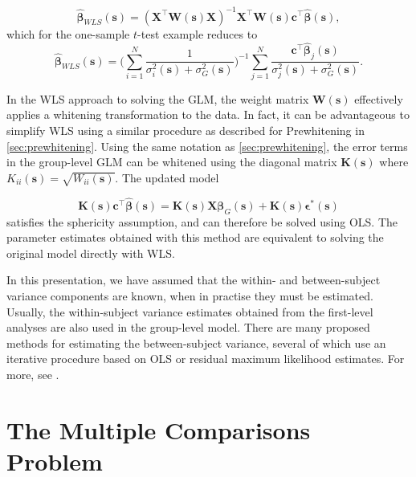 \begin{equation}
\label{eq:WLS_estimates}
\hat{\bm{\beta}}_{WLS}(\bm{s}) = (\bm{X}^{\intercal}\bm{W}(\bm{s})\bm{X})^{-1}\bm{X}^{\intercal}\bm{W}(\bm{s})\bm{c}^{\intercal}\hat{\bm{\beta}}(\bm{s}),
\end{equation}
which for the one-sample $t$-test example reduces to
\begin{equation}
\label{eq:WLS_t_test}
\hat{\bm{\beta}}_{WLS}(\bm{s}) = \Bigg(\sum_{i=1}^{N} \frac{1}{\sigma^{2}_{i}(\bm{s}) + \sigma^{2}_{G}(\bm{s})}\Bigg)^{-1}\sum_{j=1}^{N} \frac{\bm{c}^{\intercal}\hat{\bm{\beta}}_{j}(\bm{s})}{\sigma^{2}_{j}(\bm{s}) + \sigma^{2}_{G}(\bm{s})}.
\end{equation}

In the WLS approach to solving the GLM, the weight matrix $\bm{W}(\bm{s})$ effectively applies a whitening transformation to the data. In fact, it can be advantageous to simplify WLS using a similar procedure as described for Prewhitening in \ref{sec:prewhitening}. Using the same notation as \ref{sec:prewhitening}, the error terms in the group-level GLM can be whitened using the diagonal matrix $\bm{K}(\bm{s})$ where $K_{ii}(\bm{s}) = \sqrt{W_{ii}(\bm{s})}$.  The updated model

\begin{equation} 
\label{eq:whitened_group_model}
\bm{K}(\bm{s})\bm{c}^{\intercal}\hat{\bm{\beta}}(\bm{s}) = \bm{K}(\bm{s})\bm{X}\bm{\beta}_{G}(\bm{s}) + \bm{K}(\bm{s})\bm{\epsilon}^{*}(\bm{s})
\end{equation}
satisfies the sphericity assumption, and can therefore be solved using OLS. The parameter estimates obtained with this method are equivalent to solving the original model directly with WLS. 

In this presentation, we have assumed that the within- and between-subject variance components are known, when in practise they must be estimated. Usually, the within-subject variance estimates obtained from the first-level analyses are also used in the group-level model. There are many proposed methods for estimating the between-subject variance, several of which use an iterative procedure based on OLS or residual maximum likelihood estimates. For more, see \citep{Searle2009-ku, Woolrich2004-ng, Worsley2000-rb}. 

\section{The Multiple Comparisons Problem}

